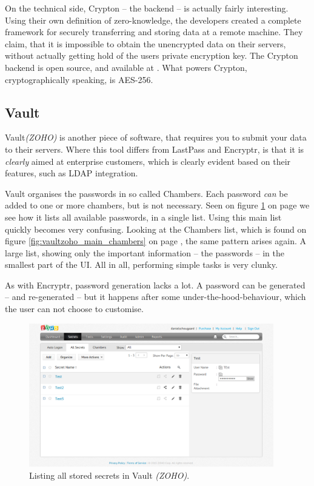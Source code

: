 			On the technical side, Crypton -- the backend -- is actually fairly interesting. Using their own definition of zero-knowledge, the developers created a complete framework for securely transferring and storing data at a remote machine\cite{crypton_paper}. They claim, that it is impossible to obtain the unencrypted data on their servers, without actually getting hold of the users private encryption key. The Crypton backend is open source, and available at \cite{crypton_git}. What powers Crypton, cryptographically speaking, is AES-256.

		\subsection*{Vault}
			Vault\emph{(ZOHO)}\cite{vault_zoho} is another piece of software, that requires you to submit your data to their servers. Where this tool differs from LastPass and Encryptr, is that it is \emph{clearly} aimed at enterprise customers, which is clearly evident based on their features, such as LDAP integration.

			Vault organises the passwords in so called Chambers. Each password \emph{can} be added to one or more chambers, but is not necessary. Seen on figure \ref{fig:vaultzoho_main_secrets} on page \pageref{fig:vaultzoho_main_secrets} we see how it lists all available passwords, in a single list. Using this main list quickly becomes very confusing. Looking at the Chambers list, which is found on figure \ref{fig:vaultzoho_main_chambers} on page \pageref{fig:vaultzoho_main_chambers}, the same pattern arises again. A large list, showing only the important information -- the passwords -- in the smallest part of the UI. All in all, performing simple tasks is very clunky.

			As with Encryptr, password generation lacks a lot. A password can be generated -- and re-generated -- but it happens after some under-the-hood-behaviour, which the user can not choose to customise.


			\begin{figure}[htbp]
				\centering
				\includegraphics[width=0.95\textwidth]{figures/analysis/vaultzoho_main_secrets.png}
				\caption{Listing all stored secrets in Vault \emph{(ZOHO)}.}
				\label{fig:vaultzoho_main_secrets}
			\end{figure}

